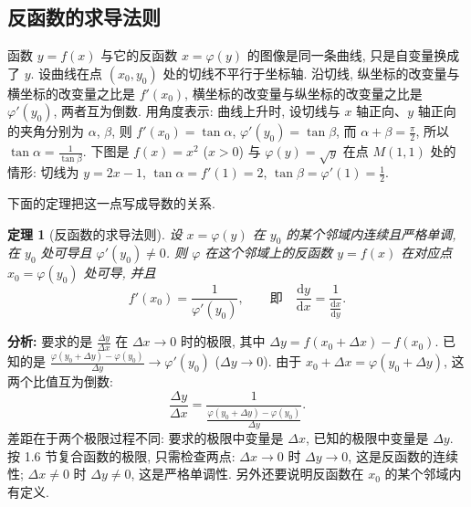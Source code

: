 \documentclass[UTF8,openany]{ctexbook}
\theoremstyle{chinesetextbook}
\newtheorem{theorem}{定理}[section]
\newcommand{\dd}{\mathrm d}
\begin{document}
\subsection{反函数的求导法则}
函数 $y=f(x)$ 与它的反函数 $x=\varphi(y)$ 的图像是同一条曲线, 只是自变量换成了 $y$. 设曲线在点 $(x_0,y_0)$ 处的切线不平行于坐标轴. 沿切线, 纵坐标的改变量与横坐标的改变量之比是 $f'(x_0)$, 横坐标的改变量与纵坐标的改变量之比是 $\varphi'(y_0)$, 两者互为倒数. 用角度表示: 曲线上升时, 设切线与 $x$ 轴正向、$y$ 轴正向的夹角分别为 $\alpha$, $\beta$, 则 $f'(x_0)=\tan\alpha$, $\varphi'(y_0)=\tan\beta$, 而 $\displaystyle\alpha+\beta=\frac\pi2$, 所以 $\displaystyle\tan\alpha=\frac1{\tan\beta}$. 下图是 $f(x)=x^2$ ($x>0$) 与 $\varphi(y)=\sqrt y$ 在点 $M(1,1)$ 处的情形: 切线为 $y=2x-1$, $\tan\alpha=f'(1)=2$, $\displaystyle\tan\beta=\varphi'(1)=\frac12$.
\begin{center}
\end{center}
下面的定理把这一点写成导数的关系.
\begin{theorem}[反函数的求导法则]\label{thm:c2-2-inv}
设 $x=\varphi(y)$ 在 $y_0$ 的某个邻域内连续且严格单调, 在 $y_0$ 处可导且 $\varphi'(y_0)\ne0$. 则 $\varphi$ 在这个邻域上的反函数 $y=f(x)$ 在对应点 $x_0=\varphi(y_0)$ 处可导, 并且
\[
f'(x_0)=\frac1{\varphi'(y_0)},\qquad\text{即}\quad\frac{\dd y}{\dd x}=\frac1{\displaystyle\frac{\dd x}{\dd y}}.
\]
\end{theorem}
\par\indent\textbf{分析:} 要求的是 $\displaystyle\frac{\Delta y}{\Delta x}$ 在 $\Delta x\to0$ 时的极限, 其中 $\Delta y=f(x_0+\Delta x)-f(x_0)$. 已知的是 $\displaystyle\frac{\varphi(y_0+\Delta y)-\varphi(y_0)}{\Delta y}\to\varphi'(y_0)$ ($\Delta y\to0$). 由于 $x_0+\Delta x=\varphi(y_0+\Delta y)$, 这两个比值互为倒数:
\[
\frac{\Delta y}{\Delta x}=\frac1{\displaystyle\frac{\varphi(y_0+\Delta y)-\varphi(y_0)}{\Delta y}}.
\]
差距在于两个极限过程不同: 要求的极限中变量是 $\Delta x$, 已知的极限中变量是 $\Delta y$. 按 1.6 节复合函数的极限, 只需检查两点: $\Delta x\to0$ 时 $\Delta y\to0$, 这是反函数的连续性; $\Delta x\ne0$ 时 $\Delta y\ne0$, 这是严格单调性. 另外还要说明反函数在 $x_0$ 的某个邻域内有定义.
\end{document}

